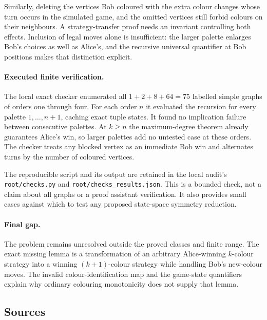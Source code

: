 \documentclass[11pt,a4paper]{article}
\begin{document}
Similarly, deleting the vertices Bob coloured with the extra colour changes whose turn occurs in the simulated game, and the omitted vertices still forbid colours on their neighbours. A strategy-transfer proof needs an invariant controlling both effects. Inclusion of legal moves alone is insufficient: the larger palette enlarges Bob's choices as well as Alice's, and the recursive universal quantifier at Bob positions makes that distinction explicit.

\paragraph{Executed finite verification.}
The local exact checker enumerated all $1+2+8+64=75$ labelled simple graphs of orders one through four. For each order $n$ it evaluated the recursion for every palette $1,\ldots,n+1$, caching exact tuple states. It found no implication failure between consecutive palettes. At $k\ge n$ the maximum-degree theorem already guarantees Alice's win, so larger palettes add no untested case at these orders. The checker treats any blocked vertex as an immediate Bob win and alternates turns by the number of coloured vertices.

The reproducible script and its output are retained in the local audit's \texttt{root/checks.py} and \texttt{root/checks\_results.json}. This is a bounded check, not a claim about all graphs or a proof assistant verification. It also provides small cases against which to test any proposed state-space symmetry reduction.

\paragraph{Final gap.}
The problem remains unresolved outside the proved classes and finite range. The exact missing lemma is a transformation of an arbitrary Alice-winning $k$-colour strategy into a winning $(k+1)$-colour strategy while handling Bob's new-colour moves. The invalid colour-identification map and the game-state quantifiers explain why ordinary colouring monotonicity does not supply that lemma.

\subsection{Sources}
\end{document}
